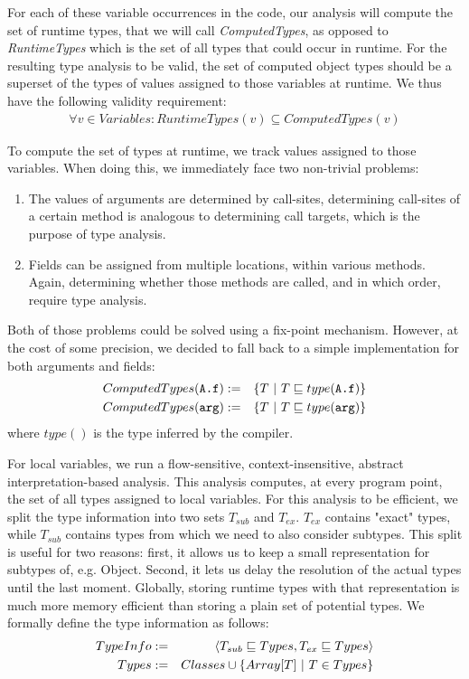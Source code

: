 For each of these variable occurrences in the code, our analysis will compute
the set of runtime types, that we will call \emph{ComputedTypes}, as opposed to
\emph{RuntimeTypes} which is the set of all types that could occur in runtime.
For the resulting type analysis to be valid, the set of computed object types
should be a superset of the types of values assigned to those variables at
runtime.  We thus have the following validity requirement:
\begin{eqnarray*}
    \forall v \in Variables: RuntimeTypes(v) \subseteq ComputedTypes(v)
\end{eqnarray*}

To compute the set of types at runtime, we track values assigned to those
variables. When doing this, we immediately face two non-trivial problems:
\begin{enumerate}
    \item The values of arguments are determined by call-sites, determining
    call-sites of a certain method is analogous to determining call targets,
    which is the purpose of type analysis.

    \item Fields can be assigned from multiple locations, within various
    methods. Again, determining whether those methods are
    called, and in which order, require type analysis.
\end{enumerate}

Both of those problems could be solved using a fix-point mechanism. However, at
the cost of some precision, we decided to fall back to a simple implementation
for both arguments and fields:
\begin{eqnarray*}
    ComputedTypes(\verb/A.f/) &:=& \{ T ~|~ T \subtypeeq type(\verb/A.f/) \} \\
    ComputedTypes(\verb/arg/) &:=& \{ T ~|~ T \subtypeeq type(\verb/arg/) \} \\
\end{eqnarray*}
where $type()$ is the type inferred by the compiler.

For local variables, we run a flow-sensitive, context-insensitive, abstract
interpretation-based analysis. This analysis computes, at every program point,
the set of all types assigned to local variables. For this analysis to be
efficient, we split the type information into two sets $T_{sub}$ and $T_{ex}$.
$T_{ex}$ contains "exact" types, while $T_{sub}$ contains types from which we
need to also consider subtypes. This split is useful for two reasons: first, it
allows us to keep a small representation for subtypes of, e.g. Object. Second,
it lets us delay the resolution of the actual types until the last moment.
Globally, storing runtime types with that representation is much more memory
efficient than storing a plain set of potential types. We formally define the
type information as follows:
\begin{eqnarray*}
    TypeInfo &:=& \langle T_{sub} \sqsubseteq Types, T_{ex} \sqsubseteq Types\rangle \\
    Types    &:=& Classes \cup \{ Array[T] ~|~ T \in Types \} \\
\end{eqnarray*}


